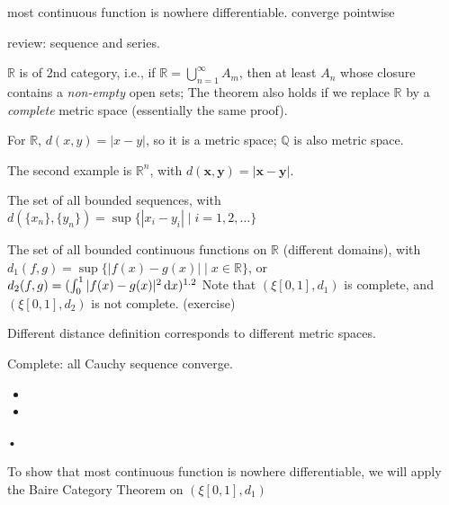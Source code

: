 most continuous function is nowhere differentiable.
converge pointwise

review: sequence and series.

\begin{remark}
$\mathbb{R}$ is of 2nd category, i.e., if $\mathbb{R} = \bigcup_{n=1}^\infty A_m$, then at least $A_n$ whose closure contains a \emph{non-empty} open sets; The theorem also holds if we replace $\mathbb{R}$ by a \emph{complete} metric space (essentially the same proof).
\end{remark}

For $\mathbb{R}$, $d(x,y) = |x-y|$, so it is a metric space; $\mathbb{Q}$ is also metric space.

The second example is $\mathbb{R}^n$, with $d(\bm x,\bm y) = |\bm x - \bm y|$.

The set of all bounded sequences, with $d(\{x_n\},\{y_n\}) = \sup\{|x_i - y_i|\mid i=1,2,\dots\}$

The set of all bounded continuous functions on $\mathbb{R}$ (different domains), with $d_1(f,g) = \sup\{|f(x) - g(x)|\mid x\in\mathbb{R}\}$, or $d_2(f,g) =( \int_0^1|f(x) - g(x)|^2\,\mathrm{d} x)^{1.2}$ Note that $(\xi[0,1],d_1)$ is complete, and $(\xi[0,1],d_2)$ is not complete. (exercise)

Different distance definition corresponds to different metric spaces.

Complete: all Cauchy sequence converge.
\begin{definition}
\begin{itemize}
\item

\item

\end{itemize}•

\end{definition}


To show that most continuous function is nowhere differentiable, we will apply the Baire Category Theorem on $(\xi[0,1],d_1)$

